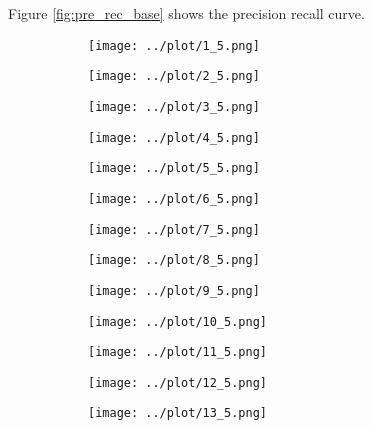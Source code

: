 \documentclass{article}
\begin{document}
Figure \ref{fig:pre_rec_base} shows the precision recall curve.
\begin{figure}[H]
	\begin{subfigure}[h]{0.15\textwidth}
		\texttt{[image: ../plot/1\_5.png]}
	\end{subfigure}
	\begin{subfigure}[h]{0.15\textwidth}
		\texttt{[image: ../plot/2\_5.png]}
	\end{subfigure}
	\begin{subfigure}[h]{0.15\textwidth}
		\texttt{[image: ../plot/3\_5.png]}
	\end{subfigure}
	\begin{subfigure}[h]{0.15\textwidth}
		\texttt{[image: ../plot/4\_5.png]}
	\end{subfigure}
	\begin{subfigure}[h]{0.15\textwidth}
		\texttt{[image: ../plot/5\_5.png]}
	\end{subfigure}
	\begin{subfigure}[h]{0.15\textwidth}
		\texttt{[image: ../plot/6\_5.png]}
	\end{subfigure}
	\begin{subfigure}[h]{0.15\textwidth}
		\texttt{[image: ../plot/7\_5.png]}
	\end{subfigure}
	\begin{subfigure}[h]{0.15\textwidth}
		\texttt{[image: ../plot/8\_5.png]}
	\end{subfigure}
	\begin{subfigure}[h]{0.15\textwidth}
		\texttt{[image: ../plot/9\_5.png]}
	\end{subfigure}
	\begin{subfigure}[h]{0.15\textwidth}
		\texttt{[image: ../plot/10\_5.png]}
	\end{subfigure}
	\begin{subfigure}[h]{0.15\textwidth}
		\texttt{[image: ../plot/11\_5.png]}
	\end{subfigure}
	\begin{subfigure}[h]{0.15\textwidth}
		\texttt{[image: ../plot/12\_5.png]}
	\end{subfigure}
	\begin{subfigure}[h]{0.15\textwidth}
		\texttt{[image: ../plot/13\_5.png]}
	\end{subfigure}
	\begin{subfigure}[h]{0.15\textwidth}

\end{subfigure}
\end{figure}
\end{document}
